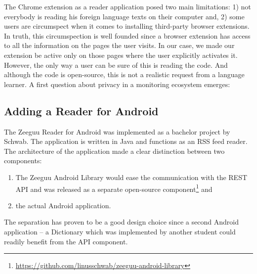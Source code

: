 

The Chrome extension as a reader application posed two main limitations: 
	1) not everybody is reading his foreign language texts on their computer and,
	2) some users are circumspect when it comes to installing third-party browser extensions. 
In truth, this circumspection is well founded since a browser extension has access to all the information on the pages the user visits. In our case, we made our extension be active only on those pages where the user explicitly activates it. However, the only way a user can be sure of this is reading the code. And although the code is open-source, this is not a realistic request from a language learner. A first question about privacy in a monitoring ecosystem emerges: 



\subsection {Adding a Reader for Android}

The Zeeguu Reader for Android was implemented as a bachelor project by Schwab\cite{Schw16thesis}. The application is written in Java and functions as an RSS feed reader. The architecture of the application made a clear distinction between two components: 

\begin{enumerate}
	\item The Zeeguu Android Library would ease the communication with the REST API and was released as a separate open-source component\footnote{\url{https://github.com/linusschwab/zeeguu-android-library}} and 
	\item the actual Android  application. 
\end{enumerate}

The separation has proven to be a good design choice since a second Android application -- a Dictionary \cite{Gieh15a} which was implemented by another student could readily benefit from the API component.

